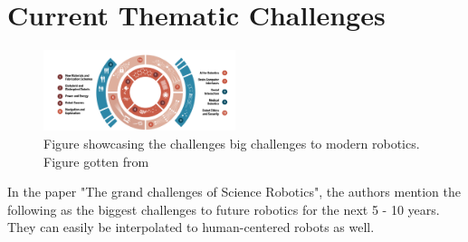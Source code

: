 \documentclass[conference]{IEEEtran}
\begin{document}
\section{Current Thematic Challenges}
\begin{figure}
    \centerline{\includegraphics[width=0.5\textwidth]{images/grand_challenges.png}}
    \caption{Figure showcasing the challenges big challenges to modern robotics. Figure gotten from\autocite{yang2018grand}}
\label{fig}
\end{figure}
In the paper "The grand challenges of Science Robotics", the authors \textcite{yang2018grand} mention the following as the biggest challenges to future robotics for the next 5 - 10 years. They can easily be interpolated to human-centered robots as well.
\end{document}
